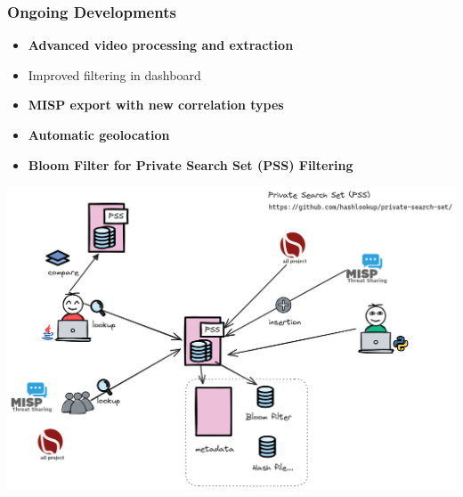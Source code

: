 \documentclass{beamer}
\begin{document}
\begin{frame}
    \frametitle{Ongoing Developments}
    \begin{itemize}
        \item \textbf{Advanced video processing and extraction}
        \item Improved filtering in dashboard
        \item \textbf{MISP export with new correlation types}
        \item \textbf{Automatic geolocation}
        \item \textbf{Bloom Filter for Private Search Set (PSS) Filtering}
    \end{itemize}
    \begin{center}
        \includegraphics[scale=0.18]{images/pss-overview.png}
    \end{center}
\end{frame}
\end{document}
